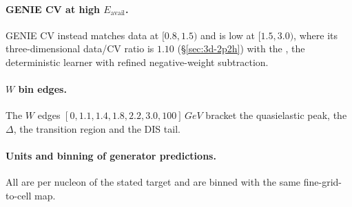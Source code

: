 \paragraph{GENIE CV at high $E_{\mathrm{avail}}$.} GENIE CV instead matches data at $[0.8,1.5)$ and is low at $[1.5,3.0)$, where its three-dimensional data/CV ratio is $1.10$ (\S\ref{sec:3d-2p2h}) with the \estMultiD{}, the deterministic learner with refined negative-weight subtraction.

\paragraph{$W$ bin edges.} The $W$ edges $[0,1.1,1.4,1.8,2.2,3.0,100]\,\si{GeV}$ bracket the quasielastic peak, the $\Delta$, the transition region and the DIS tail.

\paragraph{Units and binning of generator predictions.} All are per nucleon of the stated target and are binned with the same fine-grid-to-cell map.

